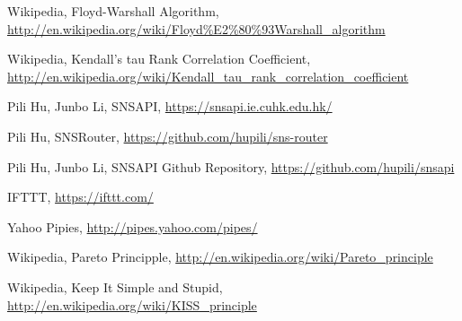 	Wikipedia, Floyd-Warshall Algorithm, 
	\url{http://en.wikipedia.org/wiki/Floyd%E2%80%93Warshall_algorithm}

	Wikipedia, Kendall's tau Rank Correlation Coefficient,
	\url{http://en.wikipedia.org/wiki/Kendall_tau_rank_correlation_coefficient}

	Pili Hu, Junbo Li, SNSAPI, \url{https://snsapi.ie.cuhk.edu.hk/}

	Pili Hu, SNSRouter, \url{https://github.com/hupili/sns-router}

	Pili Hu, Junbo Li, SNSAPI Github Repository, \url{https://github.com/hupili/snsapi}

	IFTTT, \url{https://ifttt.com/}

	Yahoo Pipies, \url{http://pipes.yahoo.com/pipes/}

	Wikipedia, Pareto Principple, \url{http://en.wikipedia.org/wiki/Pareto_principle}

	Wikipedia, Keep It Simple and Stupid, \url{http://en.wikipedia.org/wiki/KISS_principle}
